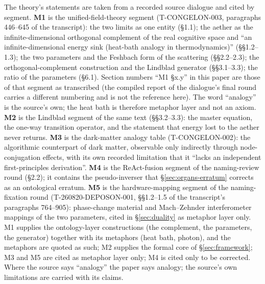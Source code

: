\documentclass[11pt,a4paper]{article}
\begin{document}
The theory's statements are taken from a recorded source dialogue and cited by segment. \textbf{M1} is the unified-field-theory segment (T-CONGELON-003, paragraphs 446--645 of the transcript): the two limits as one entity (§1.1); the aether as the infinite-dimensional orthogonal complement of the real cognitive space and ``an infinite-dimensional energy sink (heat-bath analogy in thermodynamics)'' (§§1.2--1.3); the two parameters and the Feshbach form of the scattering (§§2.2--2.3); the orthogonal-complement construction and the Lindblad generator (§§3.1--3.3); the ratio of the parameters (§6.1). Section numbers ``M1 §x.y'' in this paper are those of that segment as transcribed (the compiled report of the dialogue's final round carries a different numbering and is not the reference here). The word ``analogy'' is the source's own; the heat bath is therefore metaphor layer and not an axiom. \textbf{M2} is the Lindblad segment of the same text (§§3.2--3.3): the master equation, the one-way transition operator, and the statement that energy lost to the aether never returns. \textbf{M3} is the dark-matter analogy table (T-CONGELON-002): the algorithmic counterpart of dark matter, observable only indirectly through node-conjugation effects, with its own recorded limitation that it ``lacks an independent first-principles derivation''. \textbf{M4} is the ReAct-fusion segment of the naming-review round (§2.2); it contains the pseudo-inverser that \S\ref{sec:organs-erratum} corrects as an ontological erratum. \textbf{M5} is the hardware-mapping segment of the naming-fixation round (T-260820-DEPOSON-001, §§1.2--1.5 of the transcript's paragraphs 764--905): phase-change material and Mach--Zehnder interferometer mappings of the two parameters, cited in \S\ref{sec:duality} as metaphor layer only. M1 supplies the ontology-layer constructions (the complement, the parameters, the generator) together with its metaphors (heat bath, photon), and the metaphors are quoted as such; M2 supplies the formal core of \S\ref{sec:framework}; M3 and M5 are cited as metaphor layer only; M4 is cited only to be corrected. Where the source says ``analogy'' the paper says analogy; the source's own limitations are carried with its claims.
\end{document}
